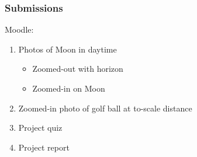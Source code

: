 \documentclass[12pt]{article}
\begin{document}
\subsubsection{Submissions}

Moodle:
\begin{enumerate}
\item Photos of Moon in daytime
    \begin{itemize}
    \item Zoomed-out with horizon
    \item Zoomed-in on Moon
    \end{itemize}
\item Zoomed-in photo of golf ball at to-scale distance
\item Project quiz
\item Project report
\end{enumerate}
\end{document}

